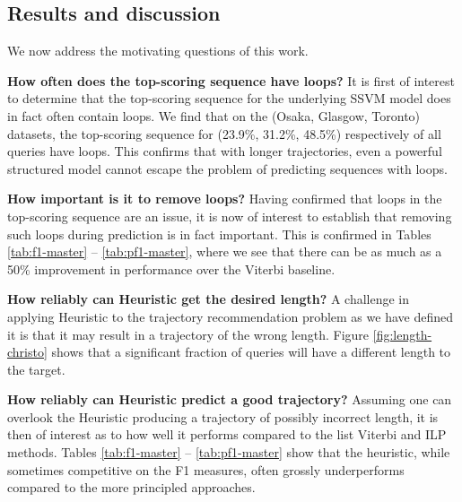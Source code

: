 %
\subsection{Results and discussion}

We now address the motivating questions of this work.

\textbf{How often does the top-scoring sequence have loops?}
It is first of interest to determine that the top-scoring sequence for the underlying SSVM model does in fact often contain loops.
We find that on the (Osaka, Glasgow, Toronto) datasets, the top-scoring sequence for (23.9\%, 31.2\%, 48.5\%) respectively of all queries have loops.
This confirms that with longer trajectories, even a powerful structured model cannot escape the problem of predicting sequences with loops.


\textbf{How important is it to remove loops?}
Having confirmed that loops in the top-scoring sequence are an issue,
it is now of interest to establish that removing such loops during prediction is in fact important.
This is confirmed in Tables \ref{tab:f1-master} -- \ref{tab:pf1-master},
where we see that there can be as much as a 50\% improvement in performance over the {\sc Viterbi} baseline.

\textbf{How reliably can {\sc Heuristic} get the desired length?}
A challenge in applying {\sc Heuristic} to the trajectory recommendation problem as we have defined it
is that it may result in a trajectory of the wrong length.
Figure \ref{fig:length-christo} shows that a significant fraction of queries will have a different length to the target.

\textbf{How reliably can {\sc Heuristic} predict a good trajectory?}
Assuming one can overlook the {\sc Heuristic} producing a trajectory of possibly incorrect length,
it is then of interest as to how well it performs compared to the list Viterbi and ILP methods.
Tables \ref{tab:f1-master} -- \ref{tab:pf1-master} show that the heuristic, while sometimes competitive on the F1 measures, often
grossly underperforms compared to the more principled approaches.


